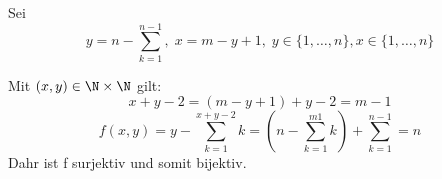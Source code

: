 Sei \[  y = n- \sum_{k=1}^{n-1}, \; x = m - y + 1, \; y \in \{ 1, \ldots, n \}, x \in \{ 1, \ldots, n \}  \]

Mit $(x,y)\in \N \times \N$ gilt:
\[ x + y - 2 = (m - y + 1) + y -2 = m-1 \]
\[ f(x,y) = y - \sum_{k=1}^{x+y-2}k = (n-\sum_{k=1}^{m1}k) + \sum_{k=1}^{n-1}=n \]
Dahr ist f surjektiv und somit bijektiv.








